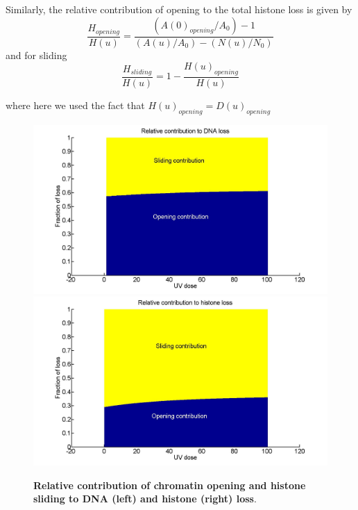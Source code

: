 \documentclass[12pt]{article}
\begin{document}
Similarly, the relative contribution of opening to the total histone loss is given by 
\begin{equation}
\frac{H_{opening}}{H(u)} =\frac{\left(A(0)_{opening}/A_0\right)-1}{(A(u)/A_0)-(N(u)/N_0)}
\end{equation}
and for sliding
\begin{equation}
\frac{H_{sliding}}{H(u)} = 1-\frac{H(u)_{opening}}{H(u)} 
\end{equation}
	
where here we used the fact that $H(u)_{opening}=D(u)_{opening}$

\begin{figure}[H]
	\includegraphics[width=0.5\linewidth, height=0.3\textheight]{relatiiveContributionToDNALoss}
	\includegraphics[width=0.5\linewidth, height=0.3\textheight]{relativeContributionToHistoneLoss}
	\caption{\textbf{Relative contribution of chromatin opening and histone sliding to DNA (left) and histone (right) loss}. }
	\label{fig:relatiiveContributionToDNALoss}
\end{figure}
\end{document}
